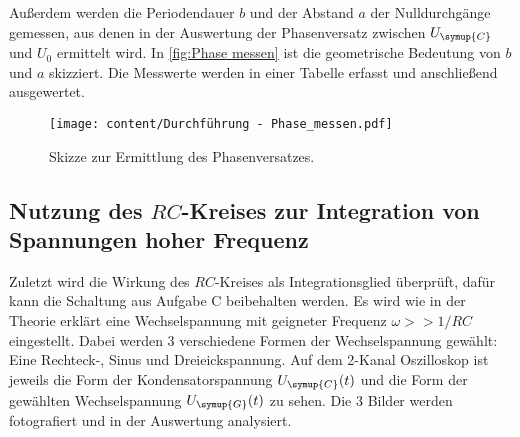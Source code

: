 Außerdem werden die Periodendauer $b$ und der Abstand $a$ der Nulldurchgänge gemessen, aus denen in der Auswertung
der Phasenversatz zwischen $U_{\symup{C}}$ und $U_{0}$ ermittelt wird. In \autoref{fig:Phase messen} ist die 
geometrische Bedeutung von $b$ und $a$ skizziert.
Die Messwerte werden in einer Tabelle erfasst und anschließend ausgewertet.
\begin{figure}%
    \centering
    \texttt{[image: content/Durchführung - Phase\_messen.pdf]}
    \caption{Skizze zur Ermittlung des Phasenversatzes. \cite{v353}}
    \label{fig:Phase messen}
\end{figure}

\subsection{Nutzung des $RC$-Kreises zur Integration von Spannungen hoher Frequenz}

Zuletzt wird die Wirkung des $RC$-Kreises als Integrationsglied überprüft, dafür kann die Schaltung aus
Aufgabe C beibehalten werden. Es wird wie in der Theorie erklärt eine Wechselspannung mit
geigneter Frequenz $\omega >> 1/RC$ eingestellt.
Dabei werden 3 verschiedene Formen der Wechselspannung gewählt: Eine Rechteck-, Sinus und Dreieickspannung.
Auf dem 2-Kanal Oszilloskop ist jeweils die Form der Kondensatorspannung $U_{\symup{C}}(t)$ und die Form der gewählten
Wechselspannung $U_{\symup{G}}(t)$ zu sehen.
Die 3 Bilder werden fotografiert und in der Auswertung analysiert.